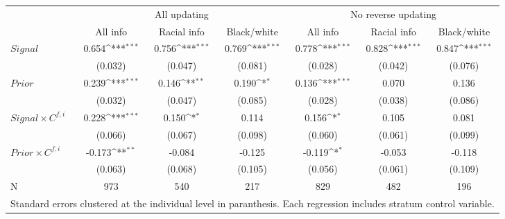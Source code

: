 {
\def\sym#1{\ifmmode^{#1}\else\(^{#1}\)\fi}
\begin{tabular}{l*{6}{c}}
\hline\hline
            &\multicolumn{3}{c}{All updating}                                 &\multicolumn{3}{c}{No reverse updating}                          \\\cmidrule(lr){2-4}\cmidrule(lr){5-7}
            &    All info         & Racial info         & Black/white         &    All info         & Racial info         & Black/white         \\

\hline
$Signal$      &       0.654\sym{***}&       0.756\sym{***}&       0.769\sym{***}&       0.778\sym{***}&       0.828\sym{***}&       0.847\sym{***}\\
            &     (0.032)         &     (0.047)         &     (0.081)         &     (0.028)         &     (0.042)         &     (0.076)         \\
$Prior$       &       0.239\sym{***}&       0.146\sym{**} &       0.190\sym{*}  &       0.136\sym{***}&       0.070         &       0.136         \\
            &     (0.032)         &     (0.047)         &     (0.085)         &     (0.028)         &     (0.038)         &     (0.086)         \\
$Signal\times C^{f,i}$&       0.228\sym{***}&       0.150\sym{*}  &       0.114         &       0.156\sym{*}  &       0.105         &       0.081         \\
            &     (0.066)         &     (0.067)         &     (0.098)         &     (0.060)         &     (0.061)         &     (0.099)         \\
$Prior\times C^{f,i}$&      -0.173\sym{**} &      -0.084         &      -0.125         &      -0.119\sym{*}  &      -0.053         &      -0.118         \\
            &     (0.063)         &     (0.068)         &     (0.105)         &     (0.056)         &     (0.061)         &     (0.109)         \\
\hline
N           &         973         &         540         &         217         &         829         &         482         &         196         \\
\hline\hline
\multicolumn{7}{l}{\footnotesize Standard errors clustered at the individual level in paranthesis. Each regression includes stratum control variable.}\\
\end{tabular}
}
